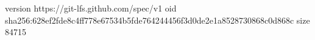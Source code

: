 version https://git-lfs.github.com/spec/v1
oid sha256:628ef2fde8c4ff778e67534b5fde764244456f3d0de2e1a8528730868c0d868c
size 84715
